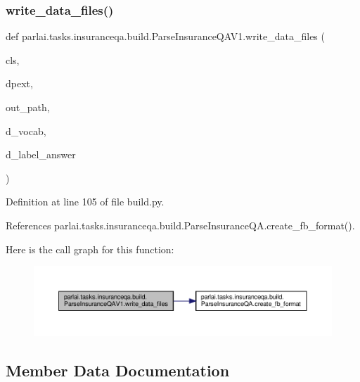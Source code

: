 \subsubsection{\texorpdfstring{write\+\_\+data\+\_\+files()}{write\_data\_files()}}
{\footnotesize\ttfamily def parlai.\+tasks.\+insuranceqa.\+build.\+Parse\+Insurance\+Q\+A\+V1.\+write\+\_\+data\+\_\+files (\begin{DoxyParamCaption}\item[{}]{cls,  }\item[{}]{dpext,  }\item[{}]{out\+\_\+path,  }\item[{}]{d\+\_\+vocab,  }\item[{}]{d\+\_\+label\+\_\+answer }\end{DoxyParamCaption})}



Definition at line 105 of file build.\+py.



References parlai.\+tasks.\+insuranceqa.\+build.\+Parse\+Insurance\+Q\+A.\+create\+\_\+fb\+\_\+format().

Here is the call graph for this function\+:
\nopagebreak
\begin{figure}[H]
\begin{center}
\leavevmode
\includegraphics[width=350pt]{classparlai_1_1tasks_1_1insuranceqa_1_1build_1_1ParseInsuranceQAV1_aec860cdc7404febddbbc3434828c74e3_cgraph}
\end{center}
\end{figure}


\subsection{Member Data Documentation}
\mbox{\label{classparlai_1_1tasks_1_1insuranceqa_1_1build_1_1ParseInsuranceQAV1_a6d912e89848985844b85a5c6f2943f5e}} 
